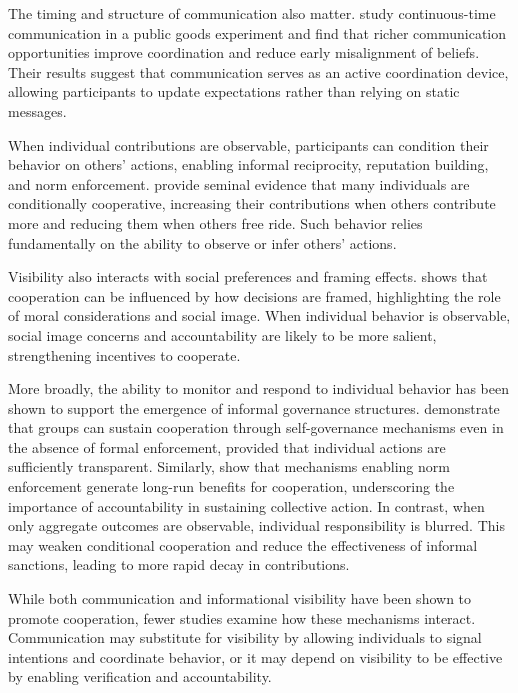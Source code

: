 \documentclass[12pt,letterpaper,english]{article}
\begin{document}
The timing and structure of communication also matter. \cite{Oprea2014_ContinuousTime} study continuous-time communication in a public goods experiment and find that richer communication opportunities improve coordination and reduce early misalignment of beliefs. Their results suggest that communication serves as an active coordination device, allowing participants to update expectations rather than relying on static messages.

When individual contributions are observable, participants can condition their behavior on others’ actions, enabling informal reciprocity, reputation building, and norm enforcement. \cite{Fischbacher2001_Conditional} provide seminal evidence that many individuals are conditionally cooperative, increasing their contributions when others contribute more and reducing them when others free ride. Such behavior relies fundamentally on the ability to observe or infer others’ actions.

Visibility also interacts with social preferences and framing effects. \cite{Andreoni1995_Cooperation} shows that cooperation can be influenced by how decisions are framed, highlighting the role of moral considerations and social image. When individual behavior is observable, social image concerns and accountability are likely to be more salient, strengthening incentives to cooperate.

More broadly, the ability to monitor and respond to individual behavior has been shown to support the emergence of informal governance structures. \cite{Ostrom1992_Covenants} demonstrate that groups can sustain cooperation through self-governance mechanisms even in the absence of formal enforcement, provided that individual actions are sufficiently transparent. Similarly, \cite{Gachter2007_Norms} show that mechanisms enabling norm enforcement generate long-run benefits for cooperation, underscoring the importance of accountability in sustaining collective action. In contrast, when only aggregate outcomes are observable, individual responsibility is blurred. This may weaken conditional cooperation and reduce the effectiveness of informal sanctions, leading to more rapid decay in contributions.

While both communication and informational visibility have been shown to promote cooperation, fewer studies examine how these mechanisms interact. Communication may substitute for visibility by allowing individuals to signal intentions and coordinate behavior, or it may depend on visibility to be effective by enabling verification and accountability.
\end{document}
